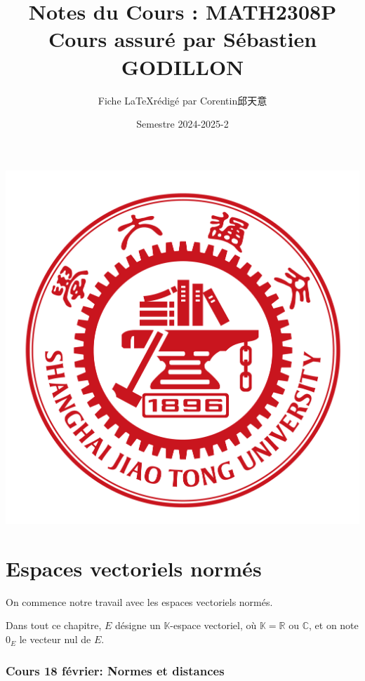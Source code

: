 \documentclass{article}
\title{\textbf{Notes du Cours : MATH2308P}\\ Cours assuré par Sébastien GODILLON}
\author{Fiche \LaTeX \space rédigé par Corentin邱天意}
\date{Semestre 2024-2025-2}
\begin{document}
\maketitle

\centerline{\includegraphics[scale=0.4]{sjtu}}

\newpage
\tableofcontents

\newpage

\part{Espaces vectoriels normés}

On commence notre travail avec les espaces vectoriels normés. 

Dans tout ce chapitre, $E$ désigne un $\mathbb{K}$-espace vectoriel, où $\mathbb{K} = \mathbb{R}$ ou $\mathbb{C}$, et on note $0_E$ le vecteur nul de $E$.


\section{Cours 18 février: Normes et distances}
\end{document}
